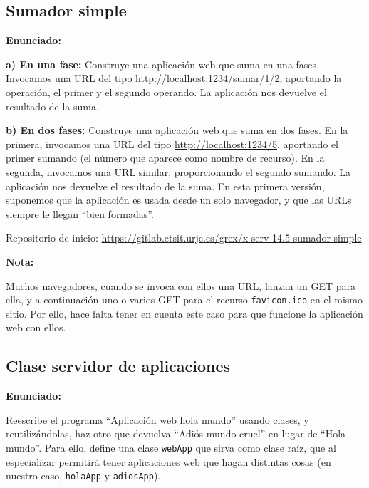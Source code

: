 \subsection{Sumador simple}
\label{subsec:sumador-simple}

\textbf{Enunciado:}

{\bf a) En una fase:} Construye una aplicación web que suma en una fases. Invocamos una URL del tipo \url{http://localhost:1234/sumar/1/2}, aportando la operación, el primer y el segundo operando. La aplicación nos devuelve el resultado de la suma.

{\bf b) En dos fases: } Construye una aplicación web que suma en dos fases. En la primera, invocamos una URL del tipo \url{http://localhost:1234/5}, aportando el primer sumando (el número que aparece como nombre de recurso). En la segunda, invocamos una URL similar, proporcionando el segundo sumando. La aplicación nos devuelve el resultado de la suma. En esta primera versión, suponemos que la aplicación es usada desde un solo navegador, y que las URLs siempre le llegan ``bien formadas''.

Repositorio de inicio: \url{https://gitlab.etsit.urjc.es/grex/x-serv-14.5-sumador-simple}

\textbf{Nota:}

Muchos navegadores, cuando se invoca con ellos una URL, lanzan un GET para ella, y a continuación uno o varios GET para el recurso \texttt{favicon.ico} en el mismo sitio. Por ello, hace falta tener en cuenta este caso para que funcione la aplicación web con ellos.

\subsection{Clase servidor de aplicaciones}
\label{subsec:clase-serv-aplis}

\textbf{Enunciado:}

Reescribe el programa ``Aplicación web hola mundo'' usando clases, y reutilizándolas, haz otro que devuelva ``Adiós mundo cruel'' en lugar de ``Hola mundo''. Para ello, define una clase \texttt{webApp} que sirva como clase raíz, que al especializar permitirá tener aplicaciones web que hagan distintas cosas (en nuestro caso, \texttt{holaApp} y \texttt{adiosApp}).

